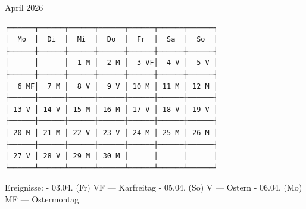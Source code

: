 April 2026

\begin{verbatim}
┌──────┬──────┬──────┬──────┬──────┬──────┬──────┐
│  Mo  │  Di  │  Mi  │  Do  │  Fr  │  Sa  │  So  │
├──────┼──────┼──────┼──────┼──────┼──────┼──────┤
│      │      │  1 M │  2 M │  3 VF│  4 V │  5 V │
├──────┼──────┼──────┼──────┼──────┼──────┼──────┤
│  6 MF│  7 M │  8 V │  9 V │ 10 M │ 11 M │ 12 M │
├──────┼──────┼──────┼──────┼──────┼──────┼──────┤
│ 13 V │ 14 V │ 15 M │ 16 M │ 17 V │ 18 V │ 19 V │
├──────┼──────┼──────┼──────┼──────┼──────┼──────┤
│ 20 M │ 21 M │ 22 V │ 23 V │ 24 M │ 25 M │ 26 M │
├──────┼──────┼──────┼──────┼──────┼──────┼──────┤
│ 27 V │ 28 V │ 29 M │ 30 M │      │      │      │
└──────┴──────┴──────┴──────┴──────┴──────┴──────┘
\end{verbatim}

Ereignisse: - 03.04. (Fr) VF --- Karfreitag - 05.04. (So) V --- Ostern -
06.04. (Mo) MF --- Ostermontag
